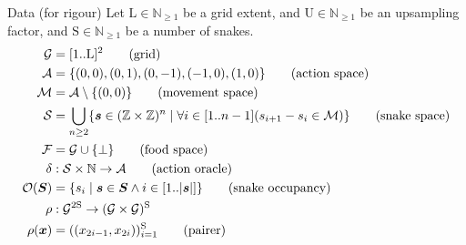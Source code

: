 \documentclass[aspectratio=169,notheorems,8pt]{beamer}
\newcommand{\N}{\mathbb{N}}
\newcommand{\Z}{\mathbb{Z}}
\newcommand{\setmid}{\;\middle|\;}
\begin{document}
\begin{frame}{Data (for rigour)}
Let $\mathrm{L}\in\N_{\geq 1}$ be a grid extent,
and $\mathrm{U}\in\N_{\geq 1}$ be an upsampling factor,
and $\mathrm{S}\in\N_{\geq 1}$ be a number of snakes.
\begin{align*}
	\mathcal{G}
	&=
	[1..\mathrm{L}]^{2}
	\tag{grid}
	\\
	\mathcal{A}
	&=
	\{(0,0),(0,1),(0,-1),(-1,0),(1,0)\}
	\tag{action space}
	\\
	\mathcal{M}
	&=
	\mathcal{A}\setminus\{(0,0)\}
	\tag{movement space}
	\\
	\mathcal{S}
	&=
	\bigcup_{n\geq 2}\mleft\{
		\bm{s}\in(\Z\times\Z)^{n}
		\setmid
		\forall i\in[1..n-1]\mleft(
			s_{i+1}-s_{i}\in\mathcal{M}
		\mright)
	\mright\}
	\tag{snake space}
	\\
	\mathcal{F}
	&=
	\mathcal{G}\cup\{\perp\}
	\tag{food space}
	\\
	\delta
	&:
	\mathcal{S}\times\N\to\mathcal{A}
	\tag{action oracle}
	\\
	\mathcal{O}(\bm{S})
	&=
	\mleft\{
		s_{i}
		\mid
		\bm{s}\in\bm{S}
		\land
		i\in[1..\abs{\bm{s}}]
	\mright\}
	\tag{snake occupancy}
	\\
	\rho
	&:
	\mathcal{G}^{2\mathrm{S}}
	\to
	(\mathcal{G}\times\mathcal{G})^{\mathrm{S}}
	\\
	\rho(\bm{x})
	&=
	(
		(x_{2i-1},x_{2i})
	)_{i=1}^{\mathrm{S}}
	\tag{pairer}
\end{align*}
\end{frame}
\end{document}
